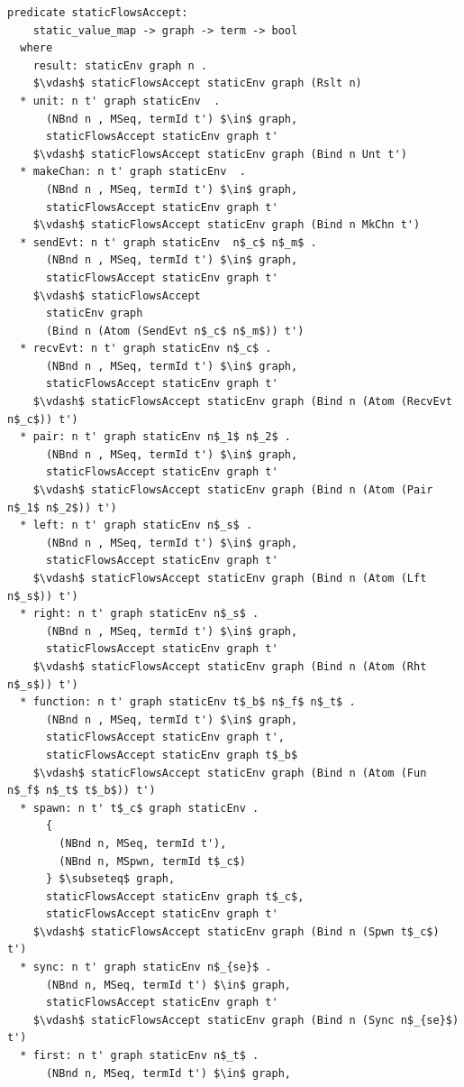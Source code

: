 \documentclass[letterpaper, 11pt]{extarticle}
\begin{document}
\begin{lstlisting}[language=logic, mathescape]
  predicate staticFlowsAccept:
    static_value_map -> graph -> term -> bool
  where
    result: staticEnv graph n .
    $\vdash$ staticFlowsAccept staticEnv graph (Rslt n)
  * unit: n t' graph staticEnv  .
      (NBnd n , MSeq, termId t') $\in$ graph,
      staticFlowsAccept staticEnv graph t'
    $\vdash$ staticFlowsAccept staticEnv graph (Bind n Unt t')
  * makeChan: n t' graph staticEnv  .
      (NBnd n , MSeq, termId t') $\in$ graph,
      staticFlowsAccept staticEnv graph t'
    $\vdash$ staticFlowsAccept staticEnv graph (Bind n MkChn t')
  * sendEvt: n t' graph staticEnv  n$_c$ n$_m$ .
      (NBnd n , MSeq, termId t') $\in$ graph, 
      staticFlowsAccept staticEnv graph t'
    $\vdash$ staticFlowsAccept
      staticEnv graph
      (Bind n (Atom (SendEvt n$_c$ n$_m$)) t')
  * recvEvt: n t' graph staticEnv n$_c$ .
      (NBnd n , MSeq, termId t') $\in$ graph,
      staticFlowsAccept staticEnv graph t'
    $\vdash$ staticFlowsAccept staticEnv graph (Bind n (Atom (RecvEvt n$_c$)) t')
  * pair: n t' graph staticEnv n$_1$ n$_2$ .
      (NBnd n , MSeq, termId t') $\in$ graph,
      staticFlowsAccept staticEnv graph t'
    $\vdash$ staticFlowsAccept staticEnv graph (Bind n (Atom (Pair n$_1$ n$_2$)) t')
  * left: n t' graph staticEnv n$_s$ .
      (NBnd n , MSeq, termId t') $\in$ graph,
      staticFlowsAccept staticEnv graph t'
    $\vdash$ staticFlowsAccept staticEnv graph (Bind n (Atom (Lft n$_s$)) t')
  * right: n t' graph staticEnv n$_s$ .
      (NBnd n , MSeq, termId t') $\in$ graph,
      staticFlowsAccept staticEnv graph t'
    $\vdash$ staticFlowsAccept staticEnv graph (Bind n (Atom (Rht n$_s$)) t')
  * function: n t' graph staticEnv t$_b$ n$_f$ n$_t$ .
      (NBnd n , MSeq, termId t') $\in$ graph,
      staticFlowsAccept staticEnv graph t', 
      staticFlowsAccept staticEnv graph t$_b$
    $\vdash$ staticFlowsAccept staticEnv graph (Bind n (Atom (Fun n$_f$ n$_t$ t$_b$)) t')
  * spawn: n t' t$_c$ graph staticEnv .
      {
        (NBnd n, MSeq, termId t'),
        (NBnd n, MSpwn, termId t$_c$)
      } $\subseteq$ graph, 
      staticFlowsAccept staticEnv graph t$_c$, 
      staticFlowsAccept staticEnv graph t'
    $\vdash$ staticFlowsAccept staticEnv graph (Bind n (Spwn t$_c$) t')
  * sync: n t' graph staticEnv n$_{se}$ .
      (NBnd n, MSeq, termId t') $\in$ graph, 
      staticFlowsAccept staticEnv graph t'
    $\vdash$ staticFlowsAccept staticEnv graph (Bind n (Sync n$_{se}$) t')
  * first: n t' graph staticEnv n$_t$ .
      (NBnd n, MSeq, termId t') $\in$ graph, 

\end{lstlisting}
\end{document}

